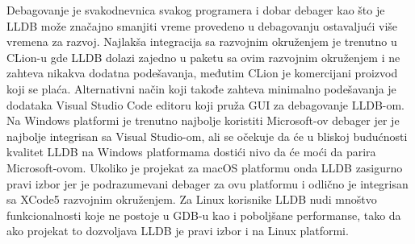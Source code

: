\documentclass[a4paper]{article}
\begin{document}
Debagovanje je svakodnevnica svakog programera i dobar debager kao što je LLDB može značajno smanjiti vreme provedeno u debagovanju ostavaljući više vremena za razvoj. 
Najlakša integracija sa razvojnim okruženjem je trenutno u CLion-u gde LLDB dolazi zajedno u paketu sa ovim razvojnim okruženjem i ne zahteva nikakva dodatna podešavanja, međutim CLion je komercijani proizvod koji se plaća. Alternativni način koji takođe zahteva minimalno podešavanja je dodataka Visual Studio Code editoru koji pruža GUI za debagovanje LLDB-om. Na Windows platformi je trenutno najbolje koristiti Microsoft-ov debager jer je najbolje integrisan sa Visual Studio-om, ali se očekuje da će u bliskoj budućnosti kvalitet LLDB na Windows platformama dostići nivo da će moći da parira Microsoft-ovom. Ukoliko je projekat za macOS platformu onda LLDB zasigurno pravi izbor jer je podrazumevani debager za ovu platformu i odlično je integrisan sa XCode5 razvojnim okruženjem. Za Linux korisnike LLDB nudi mnoštvo funkcionalnosti koje ne postoje u GDB-u kao i poboljšane performanse, tako da ako projekat to dozvoljava LLDB je pravi izbor i na Linux platformi. 
\appendix
 

\end{document}
